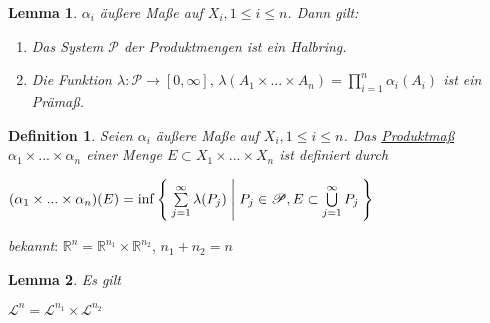 \documentclass[11pt]{memoir}
\theoremstyle{changebreak}
\newtheorem{Definition}{Definition}[chapter]
\newtheorem{Lemma}{Lemma}[chapter]
\begin{document}
\begin{Lemma}
$\alpha_i$ äußere Maße auf $X_i, 1 \leq i \leq n$. Dann gilt:
\begin{enumerate}
	\item Das System $\mathscr P$ der Produktmengen ist ein Halbring.
	\item Die Funktion $\lambda: \mathscr P \rightarrow [0, \infty], \, \lambda(A_1 \times ... \times A_n) = \prod\limits_{i=1}^n \alpha_i(A_i)$ ist ein Prämaß.
\end{enumerate}
\end{Lemma}

\begin{Definition}
Seien $\alpha_i$ äußere Maße auf $X_i, 1 \leq i \leq n$. Das \underline{Produktmaß} $\alpha_1 \times ... \times \alpha_n$ einer Menge $E \subset X_1 \times ... \times X_n$ ist definiert durch
\begin{center}
	$(\alpha_1 \times ... \times \alpha_n)(E) = \inf\Set{ \sum\limits_{j=1}^\infty \lambda(P_j) | P_j \in \mathscr P, E \subset \bigcup\limits_{j=1}^\infty P_j }$

\end{center}
\end{Definition}

\emph{bekannt}:
$\mathbb R^n = \mathbb R^{n_1} \times \mathbb R^{n_2}$, $n_1 + n_2 = n$

\begin{Lemma}
Es gilt
\begin{center}
	$\mathscr L^n = \mathscr L^{n_1} \times \mathscr L^{n_2}$
\end{center}
\end{Lemma}

\end{document}
